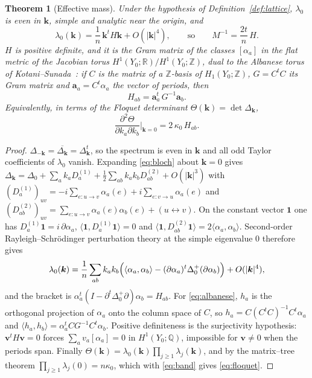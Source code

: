 \documentclass[aps,prb,reprint,amsmath,amssymb,floatfix,superscriptaddress]{revtex4-2}
\theoremstyle{plain}
\newtheorem{theorem}{Theorem}
\theoremstyle{definition}
\theoremstyle{remark}
\newcommand{\Z}{\mathbb{Z}}
\newcommand{\Q}{\mathbb{Q}}
\newcommand{\R}{\mathbb{R}}
\begin{document}
\begin{theorem}[Effective mass]\label{thm:mass}
Under the hypothesis of Definition~\ref{def:lattice}, $\lambda_0$ is even in $\bm k$,
simple and analytic near the origin, and
\begin{equation}\label{eq:band}
\lambda_0(\bm k)=\frac1n\,\bm k^{t}H\bm k+O(|\bm k|^{4}),
\qquad\text{so}\qquad
M^{-1}=\frac{2t}{n}\,H .
\end{equation}
$H$ is positive definite, and it is the Gram matrix of the classes $[\alpha_a]$ in the flat
metric of the Jacobian torus $H^{1}(Y_0;\R)/H^{1}(Y_0;\Z)$, dual to the Albanese torus of
Kotani--Sunada~\cite{KS2}: if $C$ is the matrix of a $\Z$-basis of $H_1(Y_0;\Z)$,
$G=C^{t}C$ its Gram matrix and $\bm a_a=C^{t}\alpha_a$ the vector of periods, then
\begin{equation}\label{eq:albanese}
H_{ab}=\bm a_a^{t}\,G^{-1}\bm a_b .
\end{equation}
Equivalently, in terms of the Floquet determinant $\Theta(\bm k)=\det\Delta_{\bm k}$,
\begin{equation}\label{eq:floquet}
\frac{\partial^{2}\Theta}{\partial k_a\partial k_b}\Big|_{\bm k=0}=2\,\kappa_0\,H_{ab}.
\end{equation}
\end{theorem}

\begin{proof}
$\Delta_{-\bm k}=\overline{\Delta_{\bm k}}=\Delta_{\bm k}^{t}$, so the spectrum is even in
$\bm k$ and all odd Taylor coefficients of $\lambda_0$ vanish. Expanding
\eqref{eq:bloch} about $\bm k=0$ gives $\Delta_{\bm k}=\Delta_0+\sum_a k_aD^{(1)}_a
+\tfrac12\sum_{ab}k_ak_bD^{(2)}_{ab}+O(|\bm k|^{3})$ with
$(D^{(1)}_a)_{uv}=-i\sum_{e\colon u\to v}\alpha_a(e)+i\sum_{e\colon v\to u}\alpha_a(e)$ and
$(D^{(2)}_{ab})_{uv}=\sum_{e\colon u\to v}\alpha_a(e)\alpha_b(e)+(u\!\leftrightarrow\!v)$.
On the constant vector $\bm1$ one has $D^{(1)}_a\bm1=i\,\partial\alpha_a$,
$\langle\bm1,D^{(1)}_a\bm1\rangle=0$ and
$\langle\bm1,D^{(2)}_{ab}\bm1\rangle=2\langle\alpha_a,\alpha_b\rangle$. Second-order
Rayleigh--Schr\"odinger perturbation theory at the simple eigenvalue $0$ therefore gives
\[
\lambda_0(\bm k)=\frac1n\sum_{ab}k_ak_b\Bigl(\langle\alpha_a,\alpha_b\rangle
-(\partial\alpha_a)^{t}\Delta_0^{+}(\partial\alpha_b)\Bigr)+O(|\bm k|^{4}),
\]
and the bracket is $\alpha_a^{t}(I-\partial^{t}\Delta_0^{+}\partial)\alpha_b=H_{ab}$. For
\eqref{eq:albanese}, $h_a$ is the orthogonal projection of $\alpha_a$ onto the column space
of $C$, so $h_a=C(C^{t}C)^{-1}C^{t}\alpha_a$ and
$\langle h_a,h_b\rangle=\alpha_a^{t}CG^{-1}C^{t}\alpha_b$. Positive definiteness is the
surjectivity hypothesis: $\bm v^{t}H\bm v=0$ forces $\sum_av_a[\alpha_a]=0$ in
$H^{1}(Y_0;\Q)$, impossible for $\bm v\neq0$ when the periods span. Finally
$\Theta(\bm k)=\lambda_0(\bm k)\prod_{j\ge1}\lambda_j(\bm k)$, and by the matrix--tree
theorem $\prod_{j\ge1}\lambda_j(0)=n\kappa_0$, which with \eqref{eq:band} gives
\eqref{eq:floquet}.
\end{proof}
\end{document}
